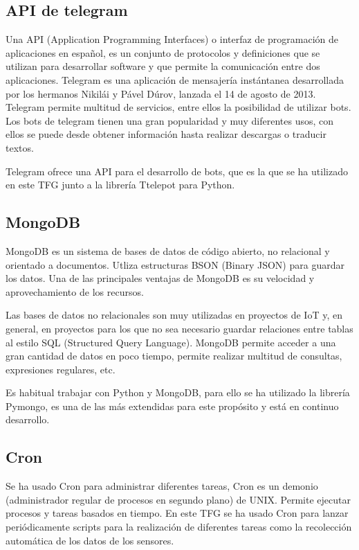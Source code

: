\documentclass[a4paper, 12pt, oneside]{book}
\begin{document}
\subsection{API de telegram}
\label{subsec:api telegram}

Una API (Application Programming Interfaces) o interfaz de programación de aplicaciones en español, es un conjunto de protocolos y definiciones que se utilizan para desarrollar software y que permite la comunicación entre dos aplicaciones. Telegram es una aplicación de mensajería instántanea desarrollada por los hermanos Nikilái y Pável Dúrov, lanzada el 14 de agosto de 2013. Telegram permite multitud de servicios, entre ellos la posibilidad de utilizar bots. Los bots de telegram tienen una gran popularidad y muy diferentes usos, con ellos se puede desde obtener información hasta realizar descargas o traducir textos.

Telegram ofrece una API para el desarrollo de bots, que es la que se ha utilizado en este TFG junto a la librería Ttelepot para Python.

\subsection{MongoDB}
\label{subsec:mongodb}

MongoDB es un sistema de bases de datos de código abierto, no relacional y orientado a documentos. Utliza estructuras BSON (Binary JSON) para guardar los datos. Una de las principales ventajas de MongoDB es su velocidad y aprovechamiento de los recursos.

Las bases de datos no relacionales son muy utilizadas en proyectos de IoT y, en general, en proyectos para los que no sea necesario guardar relaciones entre tablas al estilo SQL (Structured Query Language). MongoDB permite acceder a una gran cantidad de datos en poco tiempo, permite realizar multitud de consultas, expresiones regulares, etc.

Es habitual trabajar con Python y MongoDB, para ello se ha utilizado la librería Pymongo, es una de las más extendidas para este propósito y está en continuo desarrollo.

\subsection{Cron}
\label{subsec: cron}
Se ha usado Cron para administrar diferentes tareas, Cron es un demonio (administrador regular de procesos en segundo plano) de UNIX. Permite ejecutar procesos y tareas basados en tiempo.
En este TFG se ha usado Cron para lanzar periódicamente scripts para la realización de diferentes tareas como la recolección automática de los datos de los sensores.
 
\end{document}
